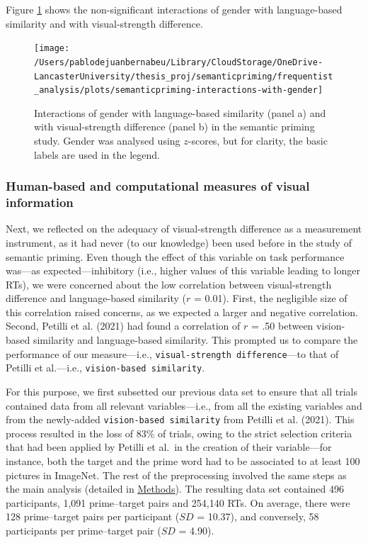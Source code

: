\documentclass[
  12pt,
  man,floatsintext]{apa7}
\begin{document}
Figure \ref{fig:semanticpriming-interactions-with-gender} shows the non-significant interactions of gender with language-based similarity and with visual-strength difference.

\begin{figure}

{\centering \texttt{[image: /Users/pablodejuanbernabeu/Library/CloudStorage/OneDrive-LancasterUniversity/thesis\_proj/semanticpriming/frequentist\_analysis/plots/semanticpriming-interactions-with-gender]} 

}

\caption{Interactions of gender with language-based similarity (panel a) and with visual-strength difference (panel b) in the semantic priming study. Gender was analysed using $z$-scores, but for clarity, the basic labels are used in the legend.}\label{fig:semanticpriming-interactions-with-gender}
\end{figure}

\hypertarget{results-human-based-and-computational-measures-of-visual-information}{%
\subsubsection{Human-based and computational measures of visual information}\label{results-human-based-and-computational-measures-of-visual-information}}

Next, we reflected on the adequacy of visual-strength difference as a measurement instrument, as it had never (to our knowledge) been used before in the study of semantic priming. Even though the effect of this variable on task performance was---as expected---inhibitory (i.e., higher values of this variable leading to longer RTs), we were concerned about the low correlation between visual-strength difference and language-based similarity (\(r\) = 0.01). First, the negligible size of this correlation raised concerns, as we expected a larger and negative correlation. Second, Petilli et al. (2021) had found a correlation of \(r\) = .50 between vision-based similarity and language-based similarity. This prompted us to compare the performance of our measure---i.e., \texttt{visual-strength\ difference}---to that of Petilli et al.---i.e., \texttt{vision-based\ similarity}.

For this purpose, we first subsetted our previous data set to ensure that all trials contained data from all relevant variables---i.e., from all the existing variables and from the newly-added \texttt{vision-based\ similarity} from Petilli et al. (2021). This process resulted in the loss of 83\% of trials, owing to the strict selection criteria that had been applied by Petilli et al.~in the creation of their variable---for instance, both the target and the prime word had to be associated to at least 100 pictures in ImageNet. The rest of the preprocessing involved the same steps as the main analysis (detailed in \protect\hyperlink{semanticpriming-dataset}{\underline{Methods}}). The resulting data set contained 496 participants, 1,091 prime--target pairs and 254,140 RTs. On average, there were 128 prime--target pairs per participant (\(SD\) = 10.37), and conversely, 58 participants per prime--target pair (\(SD\) = 4.90).
\end{document}

